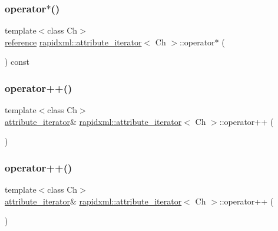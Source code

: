 \subsubsection{\texorpdfstring{operator$\ast$()}{operator*()}\hspace{0.1cm}{\footnotesize\ttfamily [2/2]}}
{\footnotesize\ttfamily template$<$class Ch$>$ \\
\mbox{\hyperlink{classrapidxml_1_1attribute__iterator_a097343e44557de14de86b470d3f917d9}{reference}} \mbox{\hyperlink{classrapidxml_1_1attribute__iterator}{rapidxml\+::attribute\+\_\+iterator}}$<$ Ch $>$\+::operator$\ast$ (\begin{DoxyParamCaption}{ }\end{DoxyParamCaption}) const\hspace{0.3cm}{\ttfamily [inline]}}

\mbox{\label{classrapidxml_1_1attribute__iterator_afe7d15a4a1b228f97f1d4ebd4f3f6cca}} 
\subsubsection{\texorpdfstring{operator++()}{operator++()}\hspace{0.1cm}{\footnotesize\ttfamily [1/4]}}
{\footnotesize\ttfamily template$<$class Ch$>$ \\
\mbox{\hyperlink{classrapidxml_1_1attribute__iterator}{attribute\+\_\+iterator}}\& \mbox{\hyperlink{classrapidxml_1_1attribute__iterator}{rapidxml\+::attribute\+\_\+iterator}}$<$ Ch $>$\+::operator++ (\begin{DoxyParamCaption}{ }\end{DoxyParamCaption})\hspace{0.3cm}{\ttfamily [inline]}}

\mbox{\label{classrapidxml_1_1attribute__iterator_afe7d15a4a1b228f97f1d4ebd4f3f6cca}} 
\subsubsection{\texorpdfstring{operator++()}{operator++()}\hspace{0.1cm}{\footnotesize\ttfamily [2/4]}}
{\footnotesize\ttfamily template$<$class Ch$>$ \\
\mbox{\hyperlink{classrapidxml_1_1attribute__iterator}{attribute\+\_\+iterator}}\& \mbox{\hyperlink{classrapidxml_1_1attribute__iterator}{rapidxml\+::attribute\+\_\+iterator}}$<$ Ch $>$\+::operator++ (\begin{DoxyParamCaption}{ }\end{DoxyParamCaption})\hspace{0.3cm}{\ttfamily [inline]}}

